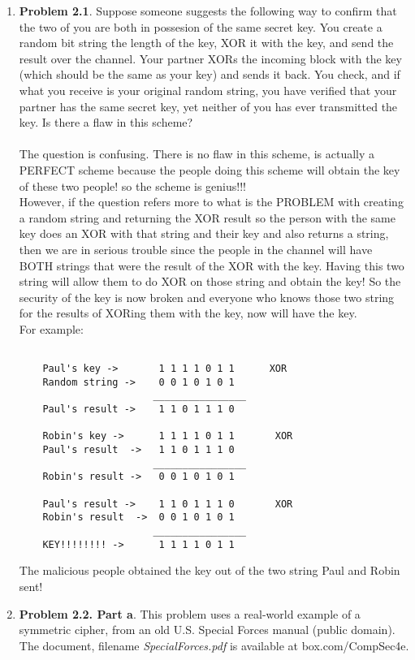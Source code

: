 \documentclass[12pt]{article}
\begin{document}
\begin{enumerate}
	
	\item {\textbf{Problem 2.1}. Suppose someone suggests the following way to confirm that the two of you are both in possesion of the same secret key. You create a random bit string the length of the key, XOR it with the key, and send the result over the channel. Your partner XORs the incoming block with the key (which should be the same as your key) and sends it back. You check, and if what you receive is your original random string, you have verified that your partner has the same secret key, yet neither of you has ever transmitted the key. Is there a flaw in this scheme?} \\\\
	The question is confusing. There is no flaw in this scheme, is actually a PERFECT scheme because the people doing this scheme will obtain the key of these two people! so the scheme is genius!!! \\ However, if the question refers more to what is the PROBLEM with creating a random string and returning the XOR result so the person with the same key does an XOR with that string and their key and also returns a string, then we are in serious trouble since the people in the channel will have BOTH strings that were the result of the XOR with the key. Having this two string will allow them to do XOR on those string and obtain the key! So the security of the key is now broken and everyone who knows those two string for the results of XORing them with the key, now will have the key. \\
	
	For example:
	\begin{verbatim}
	
	Paul's key ->       1 1 1 1 0 1 1      XOR
	Random string ->    0 0 1 0 1 0 1
	                   ________________
	Paul's result ->    1 1 0 1 1 1 0
	
	Robin's key ->      1 1 1 1 0 1 1       XOR
	Paul's result  ->   1 1 0 1 1 1 0
	                   ________________
	Robin's result ->   0 0 1 0 1 0 1
	                   
	Paul's result ->    1 1 0 1 1 1 0       XOR
	Robin's result  ->  0 0 1 0 1 0 1
	                   ________________
	KEY!!!!!!!! ->      1 1 1 1 0 1 1  

	\end{verbatim}
	The malicious people obtained the key out of the two string Paul and Robin sent! 
	\vspace{30pt}
	
	
	\item {\textbf{Problem 2.2. Part a}. This problem uses a real-world example of a symmetric cipher, from an old U.S. Special Forces manual (public domain). The document, filename \textit{SpecialForces.pdf} is available at box.com/CompSec4e.}   
	

\end{enumerate}
\end{document}
